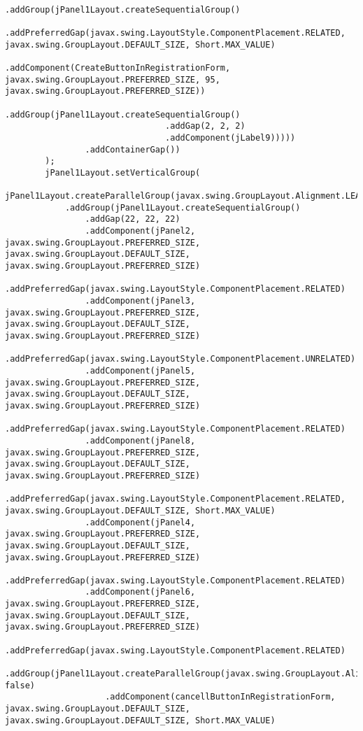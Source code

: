 \documentclass[12pt,a4paper]{article}
\begin{document}
\begin{lstlisting}
                            .addGroup(jPanel1Layout.createSequentialGroup()
                                .addPreferredGap(javax.swing.LayoutStyle.ComponentPlacement.RELATED, javax.swing.GroupLayout.DEFAULT_SIZE, Short.MAX_VALUE)
                                .addComponent(CreateButtonInRegistrationForm, javax.swing.GroupLayout.PREFERRED_SIZE, 95, javax.swing.GroupLayout.PREFERRED_SIZE))
                            .addGroup(jPanel1Layout.createSequentialGroup()
                                .addGap(2, 2, 2)
                                .addComponent(jLabel9)))))
                .addContainerGap())
        );
        jPanel1Layout.setVerticalGroup(
            jPanel1Layout.createParallelGroup(javax.swing.GroupLayout.Alignment.LEADING)
            .addGroup(jPanel1Layout.createSequentialGroup()
                .addGap(22, 22, 22)
                .addComponent(jPanel2, javax.swing.GroupLayout.PREFERRED_SIZE, javax.swing.GroupLayout.DEFAULT_SIZE, javax.swing.GroupLayout.PREFERRED_SIZE)
                .addPreferredGap(javax.swing.LayoutStyle.ComponentPlacement.RELATED)
                .addComponent(jPanel3, javax.swing.GroupLayout.PREFERRED_SIZE, javax.swing.GroupLayout.DEFAULT_SIZE, javax.swing.GroupLayout.PREFERRED_SIZE)
                .addPreferredGap(javax.swing.LayoutStyle.ComponentPlacement.UNRELATED)
                .addComponent(jPanel5, javax.swing.GroupLayout.PREFERRED_SIZE, javax.swing.GroupLayout.DEFAULT_SIZE, javax.swing.GroupLayout.PREFERRED_SIZE)
                .addPreferredGap(javax.swing.LayoutStyle.ComponentPlacement.RELATED)
                .addComponent(jPanel8, javax.swing.GroupLayout.PREFERRED_SIZE, javax.swing.GroupLayout.DEFAULT_SIZE, javax.swing.GroupLayout.PREFERRED_SIZE)
                .addPreferredGap(javax.swing.LayoutStyle.ComponentPlacement.RELATED, javax.swing.GroupLayout.DEFAULT_SIZE, Short.MAX_VALUE)
                .addComponent(jPanel4, javax.swing.GroupLayout.PREFERRED_SIZE, javax.swing.GroupLayout.DEFAULT_SIZE, javax.swing.GroupLayout.PREFERRED_SIZE)
                .addPreferredGap(javax.swing.LayoutStyle.ComponentPlacement.RELATED)
                .addComponent(jPanel6, javax.swing.GroupLayout.PREFERRED_SIZE, javax.swing.GroupLayout.DEFAULT_SIZE, javax.swing.GroupLayout.PREFERRED_SIZE)
                .addPreferredGap(javax.swing.LayoutStyle.ComponentPlacement.RELATED)
                .addGroup(jPanel1Layout.createParallelGroup(javax.swing.GroupLayout.Alignment.LEADING, false)
                    .addComponent(cancellButtonInRegistrationForm, javax.swing.GroupLayout.DEFAULT_SIZE, javax.swing.GroupLayout.DEFAULT_SIZE, Short.MAX_VALUE)

\end{lstlisting}
\end{document}

